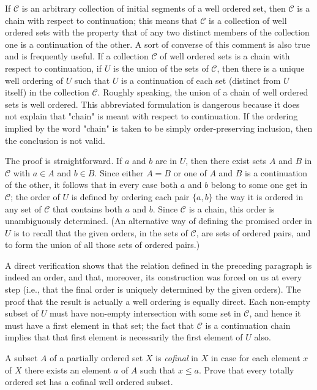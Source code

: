 If $\mathcal{C}$ is an arbitrary collection of initial segments of a well ordered set, then $\mathcal{C}$ is a chain with respect to continuation; this means that $\mathcal{C}$ is a collection of well ordered sets with the property that of any two distinct members of the collection one is a continuation of the other. A sort of converse of this comment is also true and is frequently useful. If a collection $\mathcal{C}$ of well ordered sets is a chain with respect to continuation, if $U$ is the union of the sets of $\mathcal{C}$, then there is a unique well ordering of $U$ such that $U$ is a continuation of each set (distinct from $U$ itself) in the collection $\mathcal{C}$. Roughly speaking, the union of a chain of well ordered sets is well ordered. This abbreviated formulation is dangerous because it does not explain that "chain" is meant with respect to continuation. If the ordering implied by the word "chain" is taken to be simply order-preserving inclusion, then the conclusion is not valid. 

The proof is straightforward. If $a$ and $b$ are in $U$, then there exist sets $A$ and $B$ in $\mathcal{C}$ with $a \in A$ and $b \in B$. Since either $A = B$ or one of $A$ and $B$ is a continuation of the other, it follows that in every case both $a$ and $b$ belong to some one get in $\mathcal{C}$; the order of $U$ is defined by ordering each pair $\{ a,b \}$ the way it is ordered in any set of $\mathcal{C}$ that contains both $a$ and $b$. Since $\mathcal{C}$ is a chain, this order is unambiguously determined. (An alternative way of defining the promised order in $U$ is to recall that the given orders, in the sets of $\mathcal{C}$, are sets of ordered pairs, and to form the union of all those sets of ordered pairs.) 

A direct verification shows that the relation defined in the preceding paragraph is indeed an order, and that, moreover, its  construction was forced on us at every step (i.e., that the final order is uniquely determined by the given orders). The proof that the result is actually a well ordering is equally direct. Each non-empty subset of $U$ must have non-empty intersection with some set in $\mathcal{C}$, and hence it must have a first element in that set; the fact that $\mathcal{C}$ is a continuation chain implies that that first element is necessarily the first element of $U$ also. 

\begin{named}[Exercise. ] A subset $A$ of a partially ordered set $X$ is \textit{cofinal} in $X$ in case for each element $x$ of $X$ there exists an element $a$ of $A$ such that $x \le a$. Prove that every totally ordered set has a cofinal well ordered subset.
\end{named}

